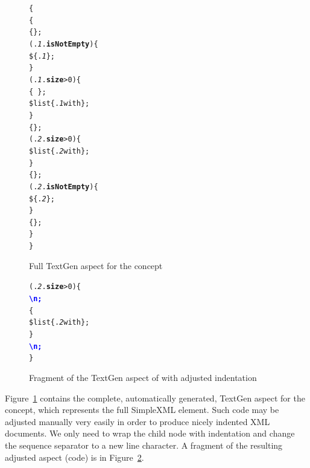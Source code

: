 \begin{figure}[ht]
\begin{alltt}
\small
{}  \{
   \{
     \{\mpstgliteral{<}\};
     (.\textit{1}.\textbf{isNotEmpty}) \{
       \$\{.\textit{1}\};
    \}
     (.\textit{1}.\textbf{size} > 0) \{
       \{\ \};
       \$list\{.\textit{1} with  \};
    \}
     \{\mpstgliteral{>}\};
     (.\textit{2}.\textbf{size} > 0) \{
       \$list\{.\textit{2} with  \};
    \}
     \{\mpstgliteral{</}\};
     (.\textit{2}.\textbf{isNotEmpty}) \{
       \$\{.\textit{2}\};
    \}
     \{\mpstgliteral{>}\};
  \}
\}
\end{alltt}
\caption{Full TextGen aspect for the  concept}
\label{fig:TEXTGENFINAL}
\end{figure}

\begin{figure}[ht]
\begin{alltt}
\small
{} (.\textit{2}.\textbf{size} > 0) \{
   \textcolor{Blue}{\textbf{\textbackslash{}n;}}
   \{
     \$list\{.\textit{2} with  \};
  \}
   \textcolor{Blue}{\textbf{\textbackslash{}n;}}
\} 
\end{alltt}
\caption{Fragment of the TextGen aspect of  with adjusted indentation}
\label{fig:TEXTGENADJUSTED}
\end{figure}

Figure~\ref{fig:TEXTGENFINAL} contains the complete, automatically generated, TextGen aspect for the  concept, which represents the full SimpleXML element.
Such code may be adjusted manually very easily in order to produce nicely indented XML documents.
We only need to wrap the  child node with indentation and change the sequence separator to a new line character.
A fragment of the resulting adjusted aspect (code) is in Figure~\ref{fig:TEXTGENADJUSTED}.


